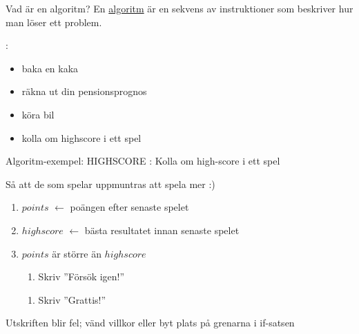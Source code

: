 \begin{Slide}{Vad är en algoritm?}
En \href{https://sv.wikipedia.org/wiki/Algoritm}{algoritm} är en sekvens av instruktioner som beskriver hur man löser ett problem.

\vspace{1em}:
\begin{itemize}
\item	 baka en kaka
\pause\item räkna ut din pensionsprognos
\pause\item köra bil
\pause\item kolla om highscore i ett spel
\end{itemize}
\ifkompendium\else
{}
\fi
\end{Slide}


\ifkompendium\else
\begin{SlideExtra}{Algoritm-exempel: HIGHSCORE}
: Kolla om high-score i ett spel \\ \vspace{1em}

 \pause Så att de som spelar uppmuntras att spela mer :) \\ \vspace{1em}

\pause
\begin{enumerate}
\item $points$ $\leftarrow$ poängen efter senaste spelet
\item $highscore$ $\leftarrow$ bästa resultatet innan senaste spelet
\item {} $points$ är större än $highscore$
\begin{enumerate}[ ~~]
\item  Skriv ''Försök igen!''
\end{enumerate}
\begin{enumerate}[ ~~]
\item  Skriv ''Grattis!''
\end{enumerate}
\end{enumerate}
\pause
\scriptsize {}

\pause Utskriften blir fel; vänd villkor eller byt plats på grenarna i if-satsen
\end{SlideExtra}
\fi

